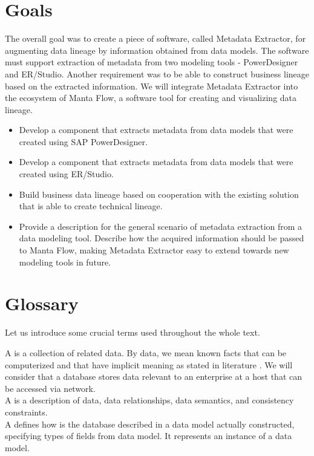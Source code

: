 \section{Goals}

The overall goal was to create a piece of software, called Metadata Extractor, for augmenting data lineage by information obtained from data models. The software must support extraction of metadata from two modeling tools - PowerDesigner and ER/Studio. Another requirement was to be able to construct business lineage based on the extracted information.
We will integrate Metadata Extractor into the ecosystem of Manta Flow, a software tool for creating and visualizing data lineage.

\begin{itemize}
	\item Develop a component that extracts metadata from data models that were created using SAP PowerDesigner.
	\item Develop a component that extracts metadata from data models that were created using ER/Studio.
	\item Build business data lineage based on cooperation with the existing solution that is able to create technical lineage.
	\item Provide a description for the general scenario of metadata extraction from a data modeling tool. Describe how the acquired information should be passed to Manta Flow, making Metadata Extractor easy to extend towards new modeling tools in future.
\end{itemize}

\section{Glossary}
Let us introduce some crucial terms used throughout the whole text.

A  is a collection of related data. By data, we mean known facts that can be computerized and that have implicit meaning as stated in literature \cite{ElmasryNavathe15}. We will consider that a database stores data relevant to an enterprise at a host that can be accessed via network. \\

A  is a description of data, data relationships, data semantics, and consistency constraints. \label{DataModel} \\
 
A  defines how is the database described in a data model actually constructed, specifying types of fields from data model. It represents an instance of a data model. \\

